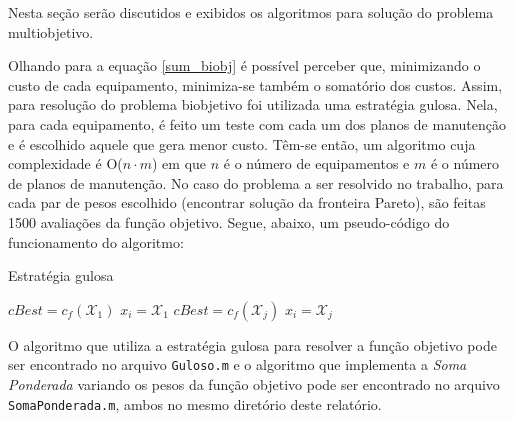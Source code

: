 Nesta seção serão discutidos e exibidos os algoritmos para solução do problema multiobjetivo.

Olhando para a equação \ref{sum_biobj} é possível perceber que, minimizando o custo de cada equipamento, minimiza-se também o somatório dos custos. Assim, para resolução do problema biobjetivo foi utilizada uma estratégia gulosa. Nela, para cada equipamento, é feito um teste com cada um dos planos de manutenção e é escolhido aquele que gera menor custo. Têm-se então, um algoritmo cuja complexidade é O($n\cdot m$) em que $n$ é o número de equipamentos e $m$ é o número de planos de manutenção. No caso do problema a ser resolvido no trabalho, para cada par de pesos escolhido (encontrar solução da fronteira Pareto), são feitas 1500 avaliações da função objetivo. Segue, abaixo, um pseudo-código do funcionamento do algoritmo:

\begin{algorithm}
	\caption{Estratégia gulosa}
	\begin{algorithmic}[1]
			\State $cBest = c_f(\mathcal{X}_1)$
			\State $x_i = \mathcal{X}_1$
					\State $cBest = c_f(\mathcal{X}_j)$
					\State $x_i = \mathcal{X}_j$
					\EndIf
			\EndFor
		\EndFor
		
	\end{algorithmic}
\end{algorithm}

O algoritmo que utiliza a estratégia gulosa para resolver a função objetivo pode ser encontrado no arquivo \texttt{Guloso.m} e o algoritmo que implementa a \emph{Soma Ponderada} variando os pesos da função objetivo pode ser encontrado no arquivo \texttt{SomaPonderada.m}, ambos no mesmo diretório deste relatório.